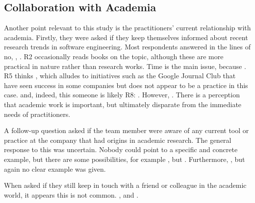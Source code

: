 \subsection{Collaboration with Academia}

Another point relevant to this study is the practitioners' current relationship with academia.
Firstly, they were asked if they keep themselves informed about recent research trends in software engineering.
Most respondents answered in the lines of no, , . 
R2 occasionally reads books on the topic, although these are more practical in nature rather than research works.
Time is the main issue, because .
R5 thinks , which alludes to initiatives such as the Google Journal Club \cite{googlejournal} that have seen success in some companies but does not appear to be a practice in this case.
 and, indeed, this someone is likely R8: .
However, .
There is a perception that academic work is important, but ultimately disparate from the immediate needs of practitioners.

A follow-up question asked if the team member were aware of any current tool or practice at the company that had origins in academic research.
The general response to this was uncertain.
Nobody could point to a specific and concrete example, but there are some possibilities, for example , but .
Furthermore, , but again no clear example was given.

When asked if they still keep in touch with a friend or colleague in the academic world, it appears this is not common.
, and .

